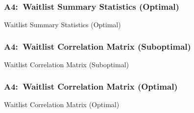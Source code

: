 \documentclass[12pt, aspectratio=169]{beamer}
\begin{document}
\begin{frame}[label=wsso]
\frametitle{A4:\ Waitlist Summary Statistics (Optimal)}
\addtocounter{framenumber}{-1}
\begin{table}[htbp]
  \centering
  \vspace{-5pt}
  \addtocounter{table}{-1}
  \renewcommand{\thetable}{\arabic{table}b}
  \caption{Waitlist Summary Statistics (Optimal)}
  \vspace{5pt}
  \begin{adjustbox}{totalheight=.7\textheight}

  \end{adjustbox}
\end{table}%
\hyperlink{wdueo}{}
\end{frame}

\begin{frame}[label=wcms]
\frametitle{A4:\ Waitlist Correlation Matrix (Suboptimal)}
\begin{table}[htbp]
  \centering
  \renewcommand{\thetable}{\arabic{table}a}
  \caption{Waitlist Correlation Matrix (Suboptimal)}
  \vspace{-5pt}
  \begin{adjustbox}{width=1\textwidth}

  \end{adjustbox}
\end{table}%
\hyperlink{wdues}{}
\end{frame}

\begin{frame}[label=wcmo]
\frametitle{A4:\ Waitlist Correlation Matrix (Optimal)}
\addtocounter{framenumber}{-1}
\begin{table}[htbp]
  \centering
  \addtocounter{table}{-1}
  \renewcommand{\thetable}{\arabic{table}b}
  \caption{Waitlist Correlation Matrix (Optimal)}
  \vspace{-5pt}
  \begin{adjustbox}{width=1\textwidth}

  \end{adjustbox}
\end{table}%
\hyperlink{wdueo}{}
\end{frame}
\end{document}
